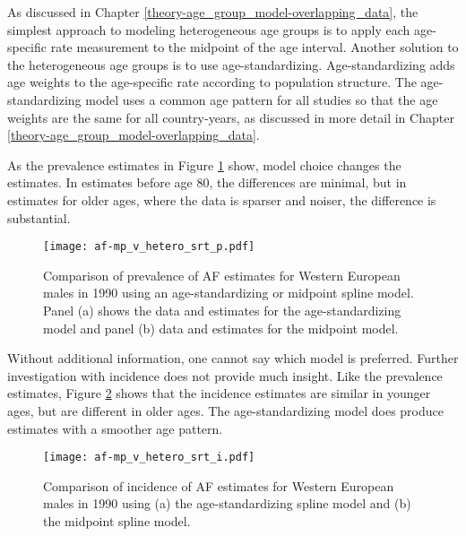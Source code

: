 As discussed in Chapter \ref{theory-age_group_model-overlapping_data},
the simplest approach to modeling heterogeneous age groups is to apply
each age-specific rate measurement to the midpoint of the age interval.
Another solution to the heterogeneous age groups is to use age-standardizing.
Age-standardizing adds age weights to the age-specific rate according
to population structure.  The age-standardizing model uses a common
age pattern for all studies so that the age weights are the same for
all country-years, as discussed in more detail in Chapter
\ref{theory-age_group_model-overlapping_data}.

As the prevalence estimates in Figure \ref{fig:app-af srt p} show,
model choice changes the estimates. In estimates before age 80, the
differences are minimal, but in estimates for older ages, where the
data is sparser and noiser, the difference is substantial.

    \begin{figure}[h]
        \begin{center}
            \texttt{[image: af-mp\_v\_hetero\_srt\_p.pdf]}
            \caption{Comparison of prevalence of AF estimates for Western European
              males in 1990 using an age-standardizing
              or midpoint spline model.  Panel (a) shows the data and 
              estimates for the age-standardizing model and panel (b)
              data and estimates for the midpoint model.}
            \label{fig:app-af srt p}
        \end{center}
    \end{figure}

Without additional information, one cannot say which model is preferred.
Further investigation with incidence does not provide much insight.  Like
the prevalence estimates, Figure \ref{fig:app-af srt i} shows that the
incidence estimates are similar in younger ages, but are different
in older ages.  The age-standardizing model does produce estimates with a
smoother age pattern.

    \begin{figure}[h]
        \begin{center}
            \texttt{[image: af-mp\_v\_hetero\_srt\_i.pdf]}
            \caption{Comparison of incidence of AF estimates for Western European
              males in 1990 using (a) the age-standardizing spline model and (b)
              the midpoint spline model.}
            \label{fig:app-af srt i}
        \end{center}
    \end{figure}
    
